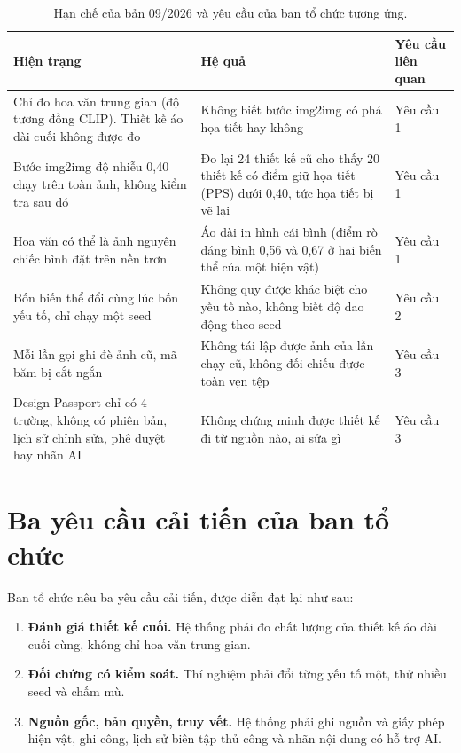 \begin{table}[htbp]
\centering
\small
\begin{tabularx}{\textwidth}{>{\raggedright\arraybackslash}p{3.2cm}>{\raggedright\arraybackslash}X>{\raggedright\arraybackslash}p{3.0cm}}
\toprule
\textbf{Hiện trạng} & \textbf{Hệ quả} & \textbf{Yêu cầu liên quan} \\
\midrule
Chỉ đo hoa văn trung gian (độ tương đồng CLIP). Thiết kế áo dài cuối không được đo &
Không biết bước img2img có phá họa tiết hay không & Yêu cầu 1 \\
Bước img2img độ nhiễu 0,40 chạy trên toàn ảnh, không kiểm tra sau đó &
Đo lại 24 thiết kế cũ cho thấy 20 thiết kế có điểm giữ họa tiết (PPS) dưới 0,40, tức họa tiết bị vẽ lại & Yêu cầu 1 \\
Hoa văn có thể là ảnh nguyên chiếc bình đặt trên nền trơn &
Áo dài in hình cái bình (điểm rò dáng bình 0,56 và 0,67 ở hai biến thể của một hiện vật) & Yêu cầu 1 \\
Bốn biến thể đổi cùng lúc bốn yếu tố, chỉ chạy một seed &
Không quy được khác biệt cho yếu tố nào, không biết độ dao động theo seed & Yêu cầu 2 \\
Mỗi lần gọi ghi đè ảnh cũ, mã băm bị cắt ngắn &
Không tái lập được ảnh của lần chạy cũ, không đối chiếu được toàn vẹn tệp & Yêu cầu 3 \\
Design Passport chỉ có 4 trường, không có phiên bản, lịch sử chỉnh sửa, phê duyệt hay nhãn AI &
Không chứng minh được thiết kế đi từ nguồn nào, ai sửa gì & Yêu cầu 3 \\
\bottomrule
\end{tabularx}
\caption{Hạn chế của bản 09/2026 và yêu cầu của ban tổ chức tương ứng.}
\label{tab:hanche}
\end{table}

\section{Ba yêu cầu cải tiến của ban tổ chức}

Ban tổ chức nêu ba yêu cầu cải tiến, được diễn đạt lại như sau:
\begin{enumerate}
  \item \textbf{Đánh giá thiết kế cuối.} Hệ thống phải đo chất lượng của thiết kế áo dài cuối cùng, không chỉ hoa văn trung gian.
  \item \textbf{Đối chứng có kiểm soát.} Thí nghiệm phải đổi từng yếu tố một, thử nhiều seed và chấm mù.
  \item \textbf{Nguồn gốc, bản quyền, truy vết.} Hệ thống phải ghi nguồn và giấy phép hiện vật, ghi công, lịch sử biên tập thủ công và nhãn nội dung có hỗ trợ AI.
\end{enumerate}

